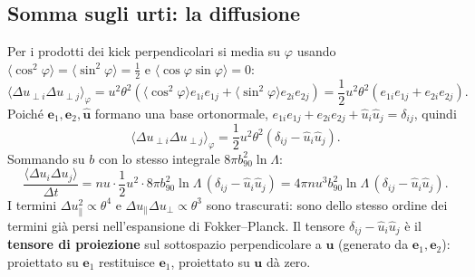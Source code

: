 \subsection{Somma sugli urti: la diffusione}
Per i prodotti dei kick perpendicolari si media su $\varphi$ usando $\langle\cos^2\varphi\rangle=\langle\sin^2\varphi\rangle=\tfrac12$ e $\langle\cos\varphi\sin\varphi\rangle=0$:
\begin{equation}
\langle\Delta u_{\perp i}\Delta u_{\perp j}\rangle_\varphi=u^2\theta^2\left(\langle\cos^2\varphi\rangle e_{1i}e_{1j}+\langle\sin^2\varphi\rangle e_{2i}e_{2j}\right)=\frac12u^2\theta^2\left(e_{1i}e_{1j}+e_{2i}e_{2j}\right).
\end{equation}
Poiché $\mathbf{e}_1,\mathbf{e}_2,\hat{\mathbf{u}}$ formano una base ortonormale, $e_{1i}e_{1j}+e_{2i}e_{2j}+\hat u_i\hat u_j=\delta_{ij}$, quindi
\begin{equation}
\langle\Delta u_{\perp i}\Delta u_{\perp j}\rangle_\varphi=\frac12u^2\theta^2\left(\delta_{ij}-\hat u_i\hat u_j\right).
\end{equation}
Sommando su $b$ con lo stesso integrale $8\pi b_{90}^2\ln\Lambda$:
\begin{equation}
\frac{\langle\Delta u_i\Delta u_j\rangle}{\Delta t}=nu\cdot\frac12u^2\cdot8\pi b_{90}^2\ln\Lambda\,(\delta_{ij}-\hat u_i\hat u_j)=4\pi nu^3b_{90}^2\ln\Lambda\,(\delta_{ij}-\hat u_i\hat u_j).
\end{equation}
I termini $\Delta u_\parallel^2\propto\theta^4$ e $\Delta u_\parallel\Delta u_\perp\propto\theta^3$ sono trascurati: sono dello stesso ordine dei termini già persi nell'espansione di Fokker--Planck. Il tensore $\delta_{ij}-\hat u_i\hat u_j$ è il \textbf{tensore di proiezione} sul sottospazio perpendicolare a $\mathbf{u}$ (generato da $\mathbf{e}_1,\mathbf{e}_2$): proiettato su $\mathbf{e}_1$ restituisce $\mathbf{e}_1$, proiettato su $\mathbf{u}$ dà zero.

